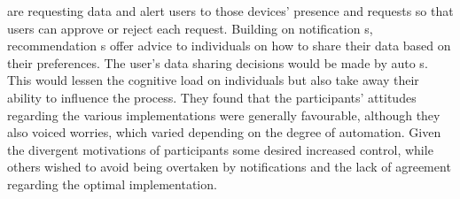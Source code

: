 are requesting data and alert users to those devices' presence and requests
so that users can approve or reject each request. Building on notification
\hyperlink{\acronym}{\acronym}s, recommendation \hyperlink{\acronym}{\acronym}s offer advice to individuals on how to share their data
based on their preferences. The user's data sharing decisions would be made
by auto \hyperlink{\acronym}{\acronym}s. This would lessen the cognitive load on individuals but also
take away their ability to influence the process. They found that the participants'
attitudes regarding the various implementations were generally favourable,
although they also voiced worries, which varied depending on the degree
of automation. Given the divergent motivations of participants some desired
increased control, while others wished to avoid being overtaken by notifications
and the lack of agreement regarding the optimal \hyperlink{\acronym}{\acronym} implementation.

